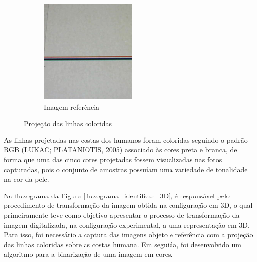 \documentclass[a4paper, 12pt]{article}
\begin{document}
\begin{figure}[h!]
\begin{subfigure}{.45\textwidth}
      \includegraphics[width=.95\linewidth]{imagem_projecao_colorida_b.png} 
      \caption{Imagem referência}
      \label{imagem_projecao_colorida:b}
    \end{subfigure}
	\caption{Projeção das linhas coloridas}
	\label{imagem_projecao_colorida}
\end{figure}

As linhas projetadas nas costas dos humanos foram coloridas seguindo o padrão RGB (LUKAC; PLATANIOTIS, 2005) associado às cores preta e branca, de forma que uma das cinco cores projetadas fossem visualizadas nas fotos capturadas, pois o conjunto de amostras possuíam uma variedade de tonalidade na cor da pele.

No fluxograma da Figura \ref{fluxograma_identificar_3D}, é responsável pelo procedimento de transformação da imagem obtida na configuração em 3D, o qual primeiramente teve como objetivo apresentar o processo de transformação da imagem digitalizada, na configuração experimental, a uma representação em 3D. Para isso, foi necessário a captura das imagens objeto e referência com a projeção das linhas coloridas sobre as costas humana. Em seguida, foi desenvolvido um algoritmo para a binarização de uma imagem em cores.
\end{document}
